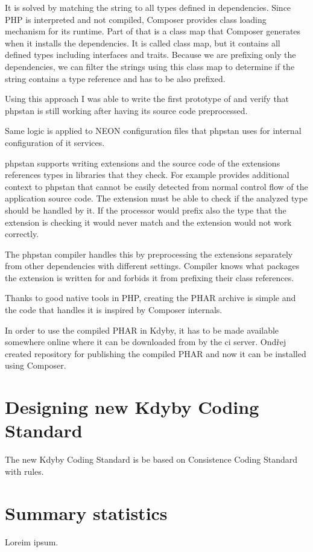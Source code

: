 It is solved by matching the string to all types defined in dependencies. Since PHP is interpreted and not compiled, Composer provides class loading mechanism for its runtime. Part of that is a class map that Composer generates when it installs the dependencies. It is called class map, but it contains all defined types including interfaces and traits. Because we are prefixing only the dependencies, we can filter the strings using this class map to determine if the string contains a type reference and has to be also prefixed.

Using this approach I was able to write the first prototype of  and verify that \gls{phpstan} is still working after having its source code preprocessed.

Same logic is applied to NEON configuration files that \gls{phpstan} uses for internal configuration of it services.

 \label{sec:refactoring:phpstan-extensions}

\gls{phpstan} supports writing extensions and the source code of the extensions references types in libraries that they check. For example  provides additional context to \gls{phpstan} that cannot be easily detected from normal control flow of the application source code. The extension must be able to check if the analyzed type should be handled by it. If the processor would prefix also the type that the extension is checking it would never match and the extension would not work correctly.

The \gls{phpstan} compiler handles this by preprocessing the extensions separately from other dependencies with different settings. Compiler knows what packages the extension is written for and forbids it from prefixing their class references.

 \label{sec:refactoring:phpstan-phar}

Thanks to good native tools in PHP, creating the PHAR archive is simple and the code that handles it is inspired by Composer internals.

 \label{sec:refactoring:phpstan-shim}

In order to use the compiled PHAR in Kdyby, it has to be made available somewhere online where it can be downloaded from by the \gls{ci} server. Ondřej created  repository for publishing the compiled PHAR and now it can be installed using Composer.

\section{Designing new Kdyby Coding Standard}

The new Kdyby Coding Standard is be based on Consistence Coding Standard~\cite{consistence:coding-standard} with  rules.

\section{Summary statistics}

Loreim ipsum.
